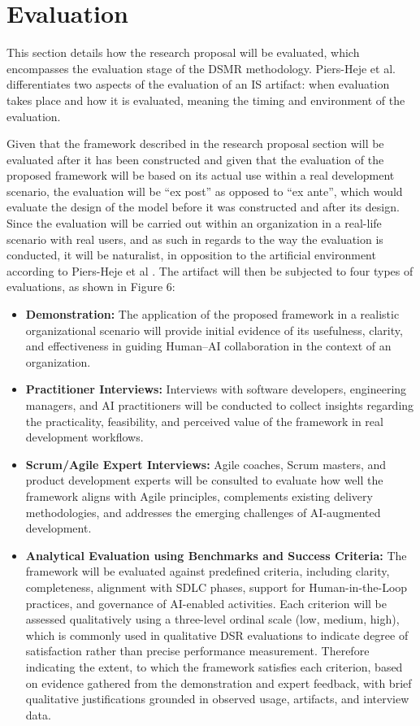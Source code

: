 \section{Evaluation}

This section details how the research proposal will be evaluated, which encompasses the evaluation stage of the DSMR methodology. Piers-Heje et al. differentiates two aspects of the evaluation of an IS artifact: when evaluation takes place and how it is evaluated, meaning the timing and environment of the evaluation. 

Given that the framework described in the research proposal section will be evaluated after it has been constructed and given that the evaluation of the proposed framework will be based on its actual use within a real development scenario, the evaluation will be “ex post” as opposed to “ex ante”, which would evaluate the design of the model before it was constructed and after its design. Since the evaluation will be carried out within an organization in a real-life scenario with real users, and as such in regards to the way the evaluation is conducted, it will be naturalist, in opposition to the artificial environment according to Piers-Heje et al \cite{J.Pries-Heje:2008SD}. The artifact will then be subjected to four types of evaluations, as shown in Figure 6:

\begin{itemize}
    \item \textbf{Demonstration:} The application of the proposed framework in a realistic organizational scenario will provide initial evidence of its usefulness, clarity, and effectiveness in guiding Human--AI collaboration in the context of an organization.
    \item \textbf{Practitioner Interviews:} Interviews with software developers, engineering managers, and AI practitioners will be conducted to collect insights regarding the practicality, feasibility, and perceived value of the framework in real development workflows.
    \item \textbf{Scrum/Agile Expert Interviews:} Agile coaches, Scrum masters, and product development experts will be consulted to evaluate how well the framework aligns with Agile principles, complements existing delivery methodologies, and addresses the emerging challenges of AI-augmented development.
   \item \textbf{Analytical Evaluation using Benchmarks and Success Criteria:} 
    The framework will be evaluated against predefined criteria, including clarity, completeness, alignment with SDLC phases, support for Human-in-the-Loop practices, and governance of AI-enabled activities. Each criterion will be assessed qualitatively using a three-level ordinal scale (low, medium, high), which is commonly used in qualitative DSR evaluations to indicate degree of satisfaction rather than precise performance measurement. Therefore indicating the extent, to which the framework satisfies each criterion, based on evidence gathered from the demonstration and expert feedback, with brief qualitative justifications grounded in observed usage, artifacts, and interview data.
\end{itemize}

